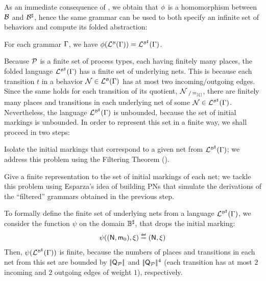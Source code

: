 As an immediate consequence of , we obtain
that $\phi$ is a homomorphism between $\mathcal{B}$ and
${\mathcal{B}}^\sharp$, hence the same \hrtext{} grammar can be used to
both specify an infinite set of behaviors and compute its folded
abstraction:

\begin{corollary}\label{prop:beh-fold}
  For each \hrtext{} grammar $\Gamma$, we have
  $\phi({\mathcal{L}_{}^{\scriptscriptstyle{\mathcal{B}}}({\Gamma})})=\mathcal{L}_{}^{\scriptscriptstyle{{\mathcal{B}}^\sharp}}({\Gamma})$.
\end{corollary}

Because $\mathcal{P}$ is a finite set of process types, each having
finitely many places, the folded language
$\mathcal{L}_{}^{\scriptscriptstyle{{\mathcal{B}}^\sharp}}({\Gamma})$ has a finite set of
underlying nets. This is because each transition $t$ in a behavior
$\mathcal{N} \in \mathcal{L}_{}^{\scriptscriptstyle{\mathcal{B}}}({\Gamma})$ has at most two
incoming/outgoing edges. Since the same holds for each transition of
its quotient, \ie $\mathcal{N}_{~/\operatorname{{\equiv}}_{[\xi]}}$, there are
finitely many places and transitions in each underlying net of some
$\mathcal{N} \in
\mathcal{L}_{}^{\scriptscriptstyle{{\mathcal{B}}^\sharp}}({\Gamma})$. Nevertheless, the language
$\mathcal{L}_{}^{\scriptscriptstyle{{\mathcal{B}}^\sharp}}({\Gamma})$ is unbounded, because the
set of initial markings is unbounded. In order to represent this set
in a finite way, we shall proceed in two
steps: \begin{compactenum}[1.]
\item\label{it1:initial-markings} Isolate the initial markings that
  correspond to a given net from
  $\mathcal{L}_{}^{\scriptscriptstyle{{\mathcal{B}}^\sharp}}({\Gamma})$; we address this problem
  using the Filtering Theorem ().
\item\label{it2:initial-markings} Give a finite representation to the
  set of initial markings of each net; we tackle this problem using
  Esparza's idea \cite{Esparza95} of building PNs that simulate the derivations of the
  ``filtered'' grammars obtained in the previous step.
\end{compactenum}

To formally define the finite set of underlying nets from a language
$\mathcal{L}_{}^{\scriptscriptstyle{{\mathcal{B}}^\sharp}}({\Gamma})$, we consider the function
$\psi$ on the domain ${\mathbb{B}}^\sharp$, that drops the initial
marking:
\begin{align}\label{eq:drop}
\psi((\mathsf{N},\mathsf{m}_0),\xi) \stackrel{\scriptscriptstyle{\mathsf{def}}}{=} (\mathsf{N},\xi)
\end{align}
Then, $\psi(\mathcal{L}_{}^{\scriptscriptstyle{{\mathcal{B}}^\sharp}}({\Gamma}))$ is finite,
because the numbers of places and transitions in each net from this
set are bounded by $|\!|{\mathsf{Q}_{\mathcal{P}}}|\!|$ and
$|\!|{\mathsf{Q}_{\mathcal{P}}}|\!|^4$ (\ie each transition has at most $2$
incoming and $2$ outgoing edges of weight $1$), respectively.

